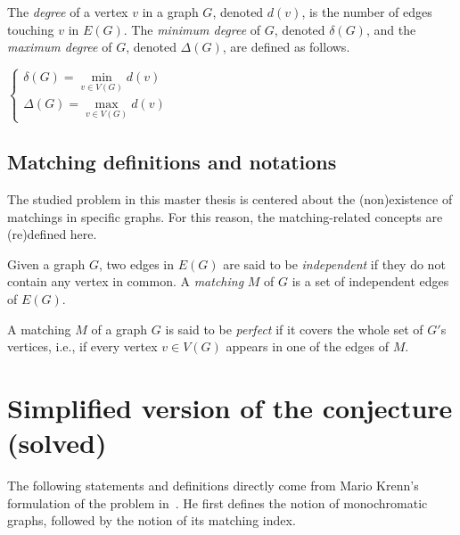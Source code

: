 \begin{definition}
    \label{def:degree}
    The \textit{degree} of a vertex $v$ in a graph $G$, denoted $d(v)$, is the number of edges touching $v$ in $E(G)$.
    The \textit{minimum degree} of $G$, denoted $\delta(G)$, and the \textit{maximum degree} of $G$, denoted $\Delta(G)$, are defined as follows.
    \begin{center}
        $\left\{
        \begin{array}{l}
            \delta(G) = \min\limits_{v \in V(G)} d(v)\\
            \Delta(G) = \max\limits_{v \in V(G)} d(v)
        \end{array}
        \right.$
    \end{center}
\end{definition}


\subsection{Matching definitions and notations}
\label{subsec:matching-definitions-and-notations}

The studied problem in this master thesis is centered about the (non)existence of matchings in specific graphs.
For this reason, the matching-related concepts are (re)defined here. \cite{graphtheory}

\begin{definition}[Matching]
    \label{def:matching}
    Given a graph $G$, two edges in $E(G)$ are said to be \textit{independent} if they do not contain any vertex in common.
    A \textit{matching} $M$ of $G$ is a set of independent edges of $E(G)$.
\end{definition}

\begin{definition}
    \label{def:perfect_matching}
    A matching $M$ of a graph $G$ is said to be \textit{perfect} if it covers the whole set of $G'$s vertices, i.e., if every vertex $v \in V(G)$ appears in one of the edges of $M$.
\end{definition}



\section{Simplified version of the conjecture (solved)}
\label{sec:simplified-version-of-the-conjecture}

The following statements and definitions directly come from Mario Krenn's formulation of the problem in~\cite{wordpress}.
He first defines the notion of monochromatic graphs, followed by the notion of its matching index.


